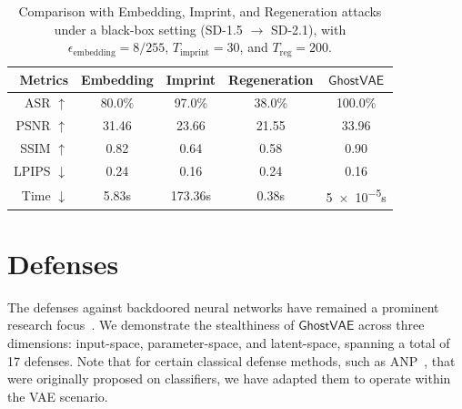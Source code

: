 \documentclass[letterpaper,twocolumn,10pt]{article}
\newcommand{\mg}{$\mathsf{GhostVAE}$\xspace}
\begin{document}
\begin{table}[t]
\centering
\caption{Comparison with Embedding, Imprint, and Regeneration attacks under a black-box setting (SD-1.5 $\rightarrow$ SD-2.1), with $\epsilon_{\text{embedding}} = 8/255$, $T_{\text{imprint}} = 30$, and $T_{\text{reg}} = 200$.}

\label{tab:removal_attack_result}
\setlength{\tabcolsep}{2.5pt}
\begin{tabular}{rcccc}
\toprule
Metrics & Embedding & Imprint & Regeneration & \mg \\
\midrule
ASR   $\uparrow$       & 80.0\%  & 97.0\% & 38.0\% & 100.0\% \\
PSNR $\uparrow$   & 31.46   & 23.66  & 21.55  &33.96 \\
SSIM $\uparrow$   & 0.82    & 0.64      & 0.58     & 0.90 \\
LPIPS $\downarrow$ & 0.24    & 0.16      & 0.24     & 0.16 \\
Time  $\downarrow$        & 5.83s    & 173.36s     & 0.38s   & \num{5e-5}s\\
\bottomrule
\end{tabular}
\end{table}


\section{Defenses}
\label{sec:defenses}
The defenses against backdoored neural networks have remained a prominent research focus~\cite{DBLP:journals/ftsec/MaGWWWSDXCZHLWZZBLWQZHL25, DBLP:journals/ijcv/WuCZZWYZWLS25,8835365,9338311}.
We demonstrate the stealthiness of \mg across three dimensions: input-space, parameter-space, and latent-space, spanning a total of 17 defenses. 
Note that for certain classical defense methods, such as ANP~\cite{DBLP:conf/iclr/ZengCPM0J22}, that were originally proposed on classifiers, we have adapted them to operate within the VAE scenario.
\end{document}
